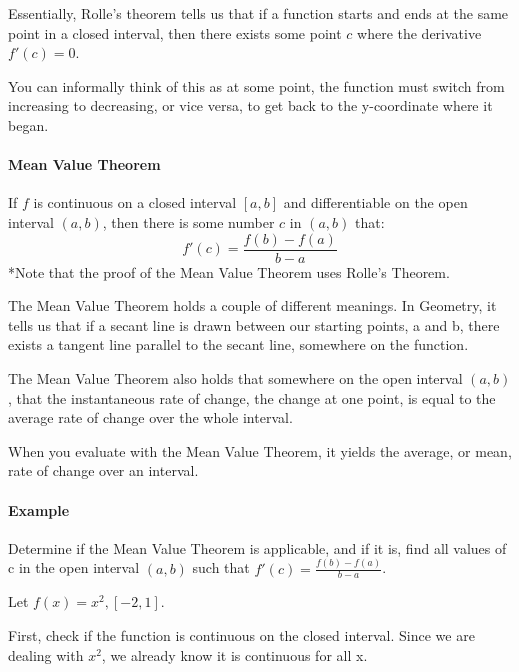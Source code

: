 Essentially, Rolle's theorem tells us that if a function starts and ends at the same point in a closed interval, then there exists some point $c$ where the derivative $f'(c) = 0$.



You can informally think of this as at some point, the function must switch from increasing to decreasing, or vice versa, to get back to the y-coordinate where it began.



\paragraph{Mean Value Theorem}



If $f$ is continuous on a closed interval $[a,b]$ and differentiable on the open interval $(a,b)$, then there is some number $c$ in $(a,b)$ that:
$$
f'(c) = \frac{f(b) - f(a)}{b-a}
$$
*Note that the proof of the Mean Value Theorem uses Rolle's Theorem.



The Mean Value Theorem holds a couple of different meanings. In Geometry, it tells us that if a secant line is drawn between our starting points, a and b, there exists a tangent line parallel to the secant line, somewhere on the function.



The Mean Value Theorem also holds that somewhere on the open interval $(a,b)$, that the instantaneous rate of change, the change at one point, is equal to the average rate of change over the whole interval.



When you evaluate with the Mean Value Theorem, it yields the average, or mean, rate of change over an interval.



\paragraph{Example}



Determine if the Mean Value Theorem is applicable, and if it is, find all values of c in the open interval $(a,b)$ such that $f'(c) = \frac{f(b) - f(a)}{b-a}$.



Let $f(x) = x^2, [-2,1]$.



First, check if the function is continuous on the closed interval. Since we are dealing with $x^2$, we already know it is continuous for all x.



